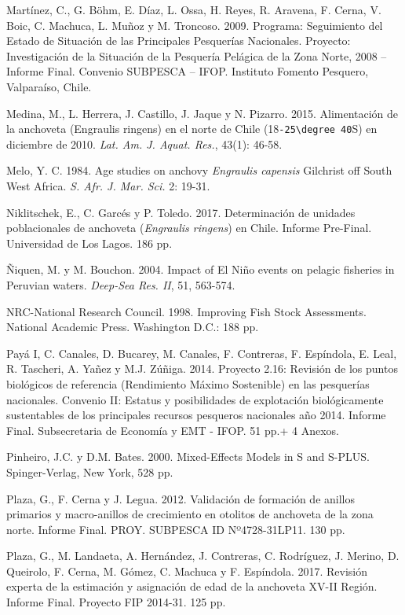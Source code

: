 \documentclass[letter,11pt]{article}
\begin{document}
Mart\'inez, C., G. B\"ohm, E. D\'iaz, L. Ossa, H. Reyes, R. Aravena, F. Cerna,
V. Boic, C. Machuca, L. Mu\~{n}oz y M. Troncoso. 2009. Programa: Seguimiento
del Estado de Situaci\'on de las Principales Pesquer\'ias Nacionales.
Proyecto: Investigaci\'on de la Situaci\'on de la Pesquer\'ia Pel\'agica de la
Zona Norte, 2008 -- Informe Final. Convenio SUBPESCA -- IFOP. Instituto
Fomento Pesquero, Valpara\'iso, Chile.

Medina, M., L. Herrera, J. Castillo, J. Jaque y N. Pizarro. 2015.
Alimentaci\'on de la anchoveta (Engraulis ringens) en el norte de Chile
(18\texttt{-25\textbackslash{}degree\ 40}S) en diciembre de
2010. \textit{Lat. Am. J. Aquat. Res.}, 43(1): 46-58.

Melo, Y. C. 1984. Age studies on anchovy \textit{Engraulis capensis}
Gilchrist off South West Africa. \textit{S. Afr. J. Mar. Sci.} 2: 19-31.

Niklitschek, E., C. Garc\'es y P. Toledo. 2017. Determinaci\'on de unidades
poblacionales de anchoveta (\textit{Engraulis ringens}) en Chile. Informe
Pre-Final. Universidad de Los Lagos. 186 pp.

\~{N}iquen, M. y M. Bouchon. 2004. Impact of El Ni\~{n}o events on pelagic
fisheries in Peruvian waters. \textit{Deep-Sea Res. II}, 51, 563-574.

NRC-National Research Council. 1998. Improving Fish Stock Assessments.
National Academic Press. Washington D.C.: 188 pp.

Pay\'a I, C. Canales, D. Bucarey, M. Canales, F. Contreras, F. Esp\'indola,
E. Leal, R. Tascheri, A. Ya\~{n}ez y M.J. Z\'u\~{n}iga. 2014. Proyecto 2.16:
Revisi\'on de los puntos biol\'ogicos de referencia (Rendimiento M\'aximo
Sostenible) en las pesquer\'ias nacionales. Convenio II: Estatus y
posibilidades de explotaci\'on biol\'ogicamente sustentables de los
principales recursos pesqueros nacionales a\~{n}o 2014. Informe Final.
Subsecretaria de Econom\'ia y EMT - IFOP. 51 pp.+ 4 Anexos.

Pinheiro, J.C. y D.M. Bates. 2000. Mixed-Effects Models in S and S-PLUS.
Spinger-Verlag, New York, 528 pp.

Plaza, G., F. Cerna y J. Legua. 2012. Validaci\'on de formaci\'on de anillos
primarios y macro-anillos de crecimiento en otolitos de anchoveta de la
zona norte. Informe Final. PROY. SUBPESCA ID Nº4728-31LP11. 130 pp.

Plaza, G., M. Landaeta, A. Hern\'andez, J. Contreras, C. Rodr\'iguez, J.
Merino, D. Queirolo, F. Cerna, M. G\'omez, C. Machuca y F. Esp\'indola.
2017. Revisi\'on experta de la estimaci\'on y asignaci\'on de edad de la
anchoveta XV-II Regi\'on. Informe Final. Proyecto FIP 2014-31. 125 pp.
\end{document}
